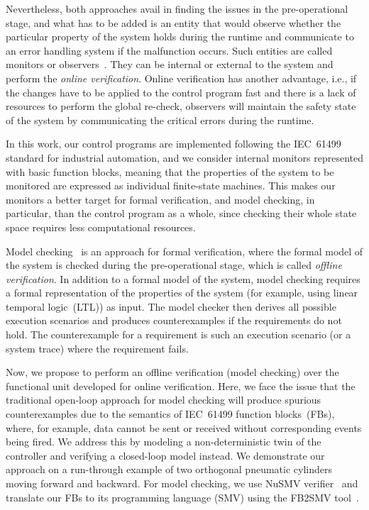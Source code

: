 \documentclass[conference]{IEEEtran}
\begin{document}
Nevertheless, both approaches avail in finding the issues in the pre-operational stage, and what has to be added is an entity that would observe whether the particular property of the system holds during the runtime and communicate to an error handling system if the malfunction occurs. Such entities are called monitors or observers~\cite{17jhunjhunwala2022monitoring}. They can be internal or external to the system and perform the \emph{online verification}. Online verification has another advantage, i.e., if the changes have to be applied to the control program fast and there is a lack of resources to perform the global re-check, observers will maintain the safety state of the system by communicating the critical errors during the runtime.

In this work, our control programs are implemented following the IEC~61499 standard for industrial automation, and we consider internal monitors represented with basic function blocks, meaning that the properties of the system to be monitored are expressed as individual finite-state machines. This makes our monitors a better target for formal verification, and model checking, in particular, than the control program as a whole, since checking their whole state space requires less computational resources.

Model checking~\cite{clarke1999} is an approach for formal verification, where the formal model of the system is checked during the pre-operational stage, which is called \emph{offline verification}. In addition to a formal model of the system, model checking requires a formal representation of the properties of the system (for example, using linear temporal logic~(LTL)) as input. The model checker then derives all possible execution scenarios and produces counterexamples if the requirements do not hold. The counterexample for a requirement is such an execution scenario (or a system trace) where the requirement fails. 

Now, we propose to perform an offline verification (model checking) over the functional unit developed for online verification. Here, we face the issue that the traditional open-loop approach for model checking will produce spurious counterexamples due to the semantics of IEC~61499 function blocks~(FBs), where, for example, data cannot be sent or received without corresponding events being fired. 
We address this by modeling a non-deterministic twin of the controller and verifying a closed-loop model instead. We demonstrate our approach on a run-through example of two orthogonal pneumatic cylinders moving forward and backward. For model checking, we use NuSMV verifier~\cite{nusmv} and translate our FBs to its programming language (SMV) using the FB2SMV tool~\cite{drozdov2015fb2smv}.
\end{document}
